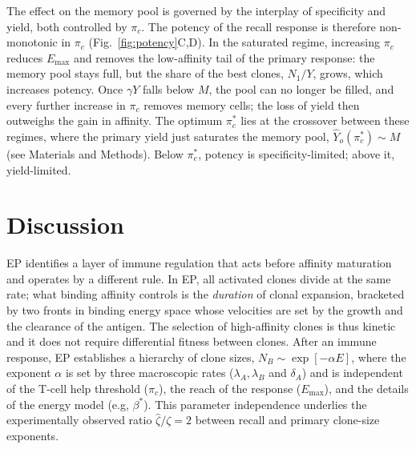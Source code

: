 \documentclass[aps, pre, twocolumn, 10pt, groupedaddress, superscriptaddress, linenumbers]{revtex4-2}
\newcommand{\DG}{E}
\newcommand{\lam}{\lambda}
\begin{document}
{The effect on the memory pool is governed by the interplay of specificity and yield, both controlled by $\pi_c$.
The potency of the recall response is therefore non-monotonic in $\pi_c$ (Fig.~\ref{fig:potency}C,D).
In the saturated regime, increasing $\pi_c$ reduces $\DG_{\max}$ and removes the low-affinity tail of the primary response: the memory pool stays full, but the share of the best clones, $N_1/Y$, grows, which increases potency.
Once $\gamma Y$ falls below $M$, the pool can no longer be filled, and every further increase in $\pi_c$ removes memory cells; the loss of yield then outweighs the gain in affinity.
The optimum $\pi_c^*$ lies at the crossover between these regimes, where the primary yield just saturates the memory pool, $\hat Y_o(\pi_c^*) \sim M$ (see Materials and Methods).
Below $\pi_c^*$, potency is specificity-limited; above it, yield-limited.
}


\section*{Discussion}


EP identifies a layer of immune regulation that acts before affinity maturation and operates by a different rule.
In EP, all activated clones divide at the same rate; what binding affinity controls is the \emph{duration} of clonal expansion, bracketed by two fronts in binding energy space whose velocities are set by the growth and the clearance of the antigen.
The selection of high-affinity clones is thus kinetic and it does not require differential fitness between clones.
After an immune response, EP establishes a hierarchy of clone sizes, $N_B \sim \exp{[-\alpha \DG]}$, where the exponent $\alpha$ is set by three macroscopic rates ($\lam_A, \lam_B$ and $\delta_A$) and is independent of the T-cell help threshold ($\pi_c$), the reach of the response ($\DG_{\max}$), and the details of the energy model (e.g, $\beta^*$).
This parameter independence underlies the experimentally observed ratio $\hat\zeta/\zeta = 2$ between recall and primary clone-size exponents.
\end{document}

